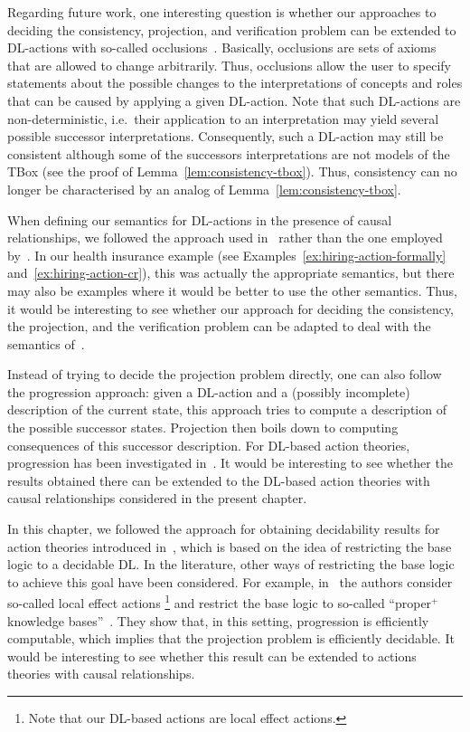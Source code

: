 Regarding future work, one interesting question is whether our approaches to
deciding the consistency, projection, and verification problem can be extended
to DL-actions with so-called occlusions~\cite{BLM+-AAAI05}.  Basically,
occlusions are sets of axioms that are allowed to change arbitrarily.  Thus,
occlusions allow the user to specify statements about the possible changes to
the interpretations of concepts and roles that can be caused by applying a given
DL-action.
%
Note that such DL-actions are non-deterministic, i.e.~their application to an
interpretation may yield several possible successor interpretations.
Consequently, such a DL-action may still be consistent although some of the
successors interpretations are not models of the TBox (see the proof of
Lemma~\ref{lem:consistency-tbox}).  Thus, consistency can no longer be
characterised by an analog of Lemma~\ref{lem:consistency-tbox}.

When defining our semantics for DL-actions in the presence of causal
relationships, we followed the approach used
in~\cite{BeDT-ESSLLI98,DeTB-LEACIS98} rather than the one employed
by~\cite{Lin-IJCAI95,Thi-AIJ97}.  In our health insurance example (see
Examples~\ref{ex:hiring-action-formally} and~\ref{ex:hiring-action-cr}), this
was actually the appropriate semantics, but there may also be examples where it
would be better to use the other semantics.  Thus, it would be interesting to
see whether our approach for deciding the consistency, the projection, and the
verification problem can be adapted to deal with the semantics
of~\cite{Lin-IJCAI95,Thi-AIJ97}.

Instead of trying to decide the projection problem directly, one can also follow
the progression approach: given a DL-action and a (possibly incomplete)
description of the current state, this approach tries to compute a description
of the possible successor states.  Projection then boils down to computing
consequences of this successor description.  For DL-based action theories,
progression has been investigated in~\cite{LLM+-AIJ11}.  It would be interesting
to see whether the results obtained there can be extended to the DL-based action
theories with causal relationships considered in the present chapter.

In this chapter, we followed the approach for obtaining decidability results for
action theories introduced in~\cite{BLM+-AAAI05}, which is based on the idea of
restricting the base logic to a decidable DL\@.  In the literature, other ways
of restricting the base logic to achieve this goal have been considered.  For
example, in~\cite{LiLa-IJCAI09} the authors consider so-called local effect
actions%
\footnote{Note that our DL-based actions are local effect actions.}
and restrict the base logic to so-called \enquote{proper$^+$ knowledge
bases}~\cite{LiLe-AAAI05}.  They show that, in this setting, progression is
efficiently computable, which implies that the projection problem is efficiently
decidable.  It would be interesting to see whether this result can be extended
to actions theories with causal relationships.

